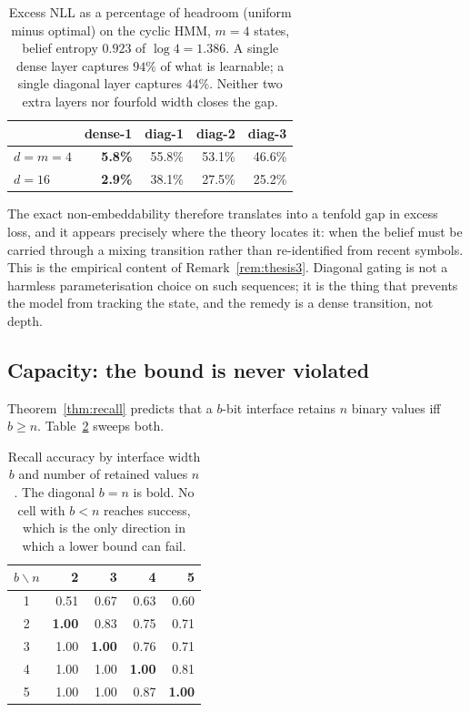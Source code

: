 \begin{table}[h]
\centering
\begin{tabular}{lrrrr}
\toprule
 & dense-1 & diag-1 & diag-2 & diag-3 \\
\midrule
$d = m = 4$ & \textbf{5.8\%} & 55.8\% & 53.1\% & 46.6\% \\
$d = 16$ & \textbf{2.9\%} & 38.1\% & 27.5\% & 25.2\% \\
\bottomrule
\end{tabular}
\caption{Excess NLL as a percentage of headroom (uniform minus optimal) on the
cyclic HMM, $m=4$ states, belief entropy $0.923$ of $\log 4 = 1.386$. A single
dense layer captures $94\%$ of what is learnable; a single diagonal layer
captures $44\%$. Neither two extra layers nor fourfold width closes the gap.}
\label{tab:bite}
\end{table}

The exact non-embeddability therefore translates into a tenfold gap in excess
loss, and it appears precisely where the theory locates it: when the belief
must be carried through a mixing transition rather than re-identified from
recent symbols. This is the empirical content of Remark~\ref{rem:thesis3}.
Diagonal gating is not a harmless parameterisation choice on such sequences;
it is the thing that prevents the model from tracking the state, and the
remedy is a dense transition, not depth.

\subsection{Capacity: the bound is never violated}
\label{sec:exp-capacity}

Theorem~\ref{thm:recall} predicts that a $b$-bit interface retains $n$ binary
values iff $b \ge n$. Table~\ref{tab:capacity} sweeps both.

\begin{table}[h]
\centering
\begin{tabular}{crrrr}
\toprule
$b \backslash n$ & 2 & 3 & 4 & 5 \\
\midrule
1 & 0.51 & 0.67 & 0.63 & 0.60 \\
2 & \textbf{1.00} & 0.83 & 0.75 & 0.71 \\
3 & 1.00 & \textbf{1.00} & 0.76 & 0.71 \\
4 & 1.00 & 1.00 & \textbf{1.00} & 0.81 \\
5 & 1.00 & 1.00 & 0.87 & \textbf{1.00} \\
\bottomrule
\end{tabular}
\caption{Recall accuracy by interface width $b$ and number of retained values
$n$. The diagonal $b=n$ is bold. No cell with $b<n$ reaches success, which is
the only direction in which a lower bound can fail.}
\label{tab:capacity}
\end{table}

